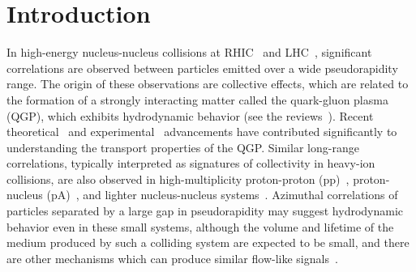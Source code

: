 
\section{Introduction}
\label{sec:intro}

In high-energy nucleus-nucleus collisions at RHIC~\cite{Adams:2005dq,Adcox:2004mh,Arsene:2004fa,Back:2004je} and LHC~\cite{Abelev:2012di, Abelev:2014pua, ATLAS:2011ah}, significant correlations are observed between particles emitted over a wide pseudorapidity range. The origin of these observations are collective effects, which are related to the formation of a strongly interacting matter called the quark-gluon plasma (QGP), which exhibits hydrodynamic behavior (see the reviews~\cite{Romatschke:2007mq,Jeon:2015dfa,Romatschke:2017ejr}). 
Recent theoretical~\cite{Niemi:2015qia,Bernhard:2016tnd,Bernhard2019} and experimental~\cite{ALICE:2016kpq,Acharya:2017gsw,Acharya:2017zfg,Acharya:2020taj} advancements have contributed significantly to understanding the transport properties of the QGP.
Similar long-range correlations, typically interpreted as signatures of collectivity in heavy-ion collisions, are also observed in high-multiplicity proton-proton (pp)~\cite{Aad:2015gqa,Khachatryan:2015lva,Khachatryan:2016txc,Acharya:2019vdf}, proton-nucleus (pA)~\cite{Abelev:2012ola,Aad:2014lta,Aaboud:2016yar,Khachatryan:2016ibd}, and lighter nucleus-nucleus systems~\cite{PHENIX:2018lia,Aidala:2017ajz}.
Azimuthal correlations of particles separated by a large gap in pseudorapidity may suggest hydrodynamic behavior even in these small systems, although the volume and lifetime of the medium produced by such a colliding system are expected to be small, and there are other mechanisms which can produce similar flow-like signals~\cite{Busza:2018rrf,Nagle:2018nvi}.

